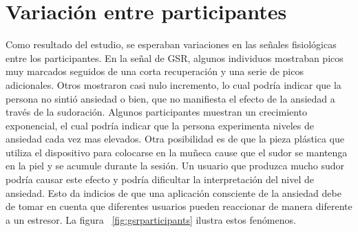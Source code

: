 

\section{Variaci\'on entre participantes}
Como resultado del estudio, se esperaban variaciones en las se\~nales fisiol\'ogicas entre los participantes. En la se\~nal de GSR, algunos individuos mostraban picos muy marcados seguidos de una corta recuperaci\'on y una serie de picos adicionales. Otros mostraron casi nulo incremento, lo cual podr\'ia indicar que la persona no sinti\'o ansiedad o bien, que no manifiesta el efecto de la ansiedad a trav\'es de la sudoraci\'on. Algunos participantes muestran un crecimiento exponencial, el cual podr\'ia indicar que la persona experimenta niveles de ansiedad cada vez mas elevados. Otra posibilidad es de que la pieza pl\'astica que utiliza el dispositivo para colocarse en la mu\~neca cause que el sudor se mantenga en la piel y se acumule durante la sesi\'on. Un usuario que produzca mucho sudor podr\'ia causar este efecto y podr\'ia dificultar la interpretaci\'on del nivel de ansiedad. Esto da indicios de que una aplicaci\'on consciente de la ansiedad debe de tomar en cuenta que diferentes usuarios pueden reaccionar de manera diferente a un estresor. La figura ~\ref{fig:gsrparticipants} ilustra estos fen\'omenos.


